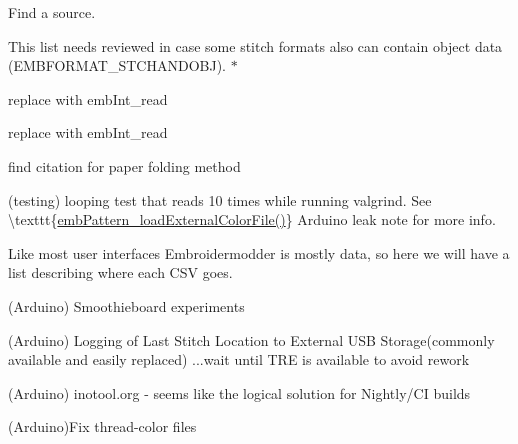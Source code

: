 \begin{DoxyRefList}
\label{todo__todo000426}%
%
Find a source. 
\item[Member \mbox{\hyperlink{formats_8c_a8cb11404ce46501561f956d33f8dcf95}{format\+Table}} \mbox{[}number\+Of\+Formats\mbox{]}]\label{todo__todo000402}%
%
This list needs reviewed in case some stitch formats also can contain object data (EMBFORMAT\+\_\+\+STCHANDOBJ). $\ast$  
\item[Member \mbox{\hyperlink{formats_8c_a05fb50e7292226bc2947dd2b4da7a9bd}{fread\+\_\+int32\+\_\+be}} (FILE $\ast$f)]\label{todo__todo000404}%
%
replace with emb\+Int\+\_\+read  
\item[Member \mbox{\hyperlink{formats_8c_a2bcdb1e6bf6930d5c054ecdca9831eba}{fread\+\_\+uint16}} (FILE $\ast$f)]\label{todo__todo000403}%
%
replace with emb\+Int\+\_\+read  
\item[Member \mbox{\hyperlink{fill_8c_ad02b5d945eacff708d2bf084c40044d8}{generate\+\_\+dragon\+\_\+curve}} (char $\ast$state, int iterations)]\label{todo__todo000397}%
%
find citation for paper folding method  
\item[Page \mbox{\hyperlink{md_extern_libembroidery_src_geometry_geometry}{Geometry and Algorithms}} ]\label{todo__todo000420}%
%
(testing) looping test that reads 10 times while running valgrind. See \textbackslash{}texttt\{\mbox{\hyperlink{embroidery_8h_a3bf191bd99e2da8d36465f454a4646f6}{emb\+Pattern\+\_\+load\+External\+Color\+File()}}\} Arduino leak note for more info.

\label{todo__todo000421}%
%
Like most user interfaces Embroidermodder is mostly data, so here we will have a list describing where each CSV goes.

\label{todo__todo000419}%
%
(Arduino) Smoothieboard experiments

\label{todo__todo000417}%
%
(Arduino) Logging of Last Stitch Location to External USB Storage(commonly available and easily replaced) ...wait until TRE is available to avoid rework

\label{todo__todo000418}%
%
(Arduino) inotool.\+org -\/ seems like the logical solution for Nightly/\+CI builds

\label{todo__todo000416}%
%
(Arduino)Fix thread-\/color files


\end{DoxyRefList}
